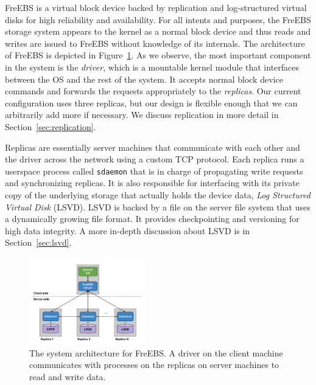FreEBS is a virtual block device backed by replication and log-structured
virtual disks for high reliability and availability. For all intents and 
purposes, the FreEBS storage system appears to the kernel as a normal block
device and thus reads and writes are issued to FreEBS without knowledge of 
its internals. The architecture of FreEBS is depicted in 
Figure~\ref{fig:architecture}. As we observe, the most important component in
the system is the \emph{driver}, which is a mountable kernel module that 
interfaces between the OS and the rest of the system. It accepts normal 
block device commands and forwards the requests appropriately to the 
\emph{replicas}. Our current configuration uses three replicas, but our 
design is flexible enough that we can arbitrarily add more if necessary. We 
discuss replication in more detail in Section~\ref{sec:replication}.
 
Replicas are essentially server machines that communicate with each other 
and the driver across the network using a custom TCP protocol. Each replica 
runs a userspace process called \texttt{sdaemon} that is in 
charge of propagating write requests and synchronizing replicas. It is also
responsible for interfacing with its private copy of the underlying storage 
that actually holds the device data, \emph{Log Structured Virtual Disk}
(LSVD). LSVD is backed by a file on the server file system that uses a 
dynamically growing file format. It provides checkpointing and versioning 
for high data integrity. A more in-depth discussion about LSVD is in 
Section~\ref{sec:lsvd}.

\begin{figure}[h]
    \includegraphics[width=0.45\textwidth]{./figures/systemarch.pdf}    
    \caption{The system architecture for FreEBS. A driver on the client 
            machine communicates with processes on the replicas on server 
            machines to read and write data.}
    \label{fig:architecture}
\end{figure}


